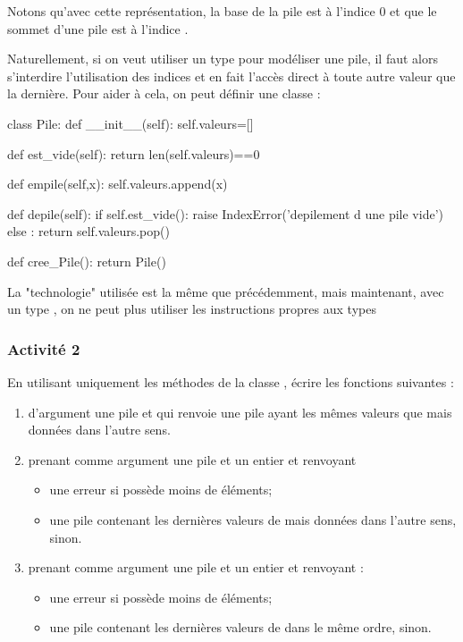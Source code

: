 \documentclass[11pt,a4paper,french,twoside]{PMCours}
\begin{document}
Notons qu'avec cette représentation, la base de la pile est à l'indice 0 et que 
le sommet d'une pile  est à l'indice .


Naturellement, si on veut utiliser un type  pour modéliser une pile, 
il faut alors s'interdire l'utilisation des indices et en fait l'accès direct à 
toute autre valeur que la dernière.
\newpage\noindent
Pour aider à cela, on peut définir une classe  :

\begin{Python}
class Pile:
    def __init__(self):
        self.valeurs=[]
    
    def est_vide(self):
        return len(self.valeurs)==0
    
    def empile(self,x):
        self.valeurs.append(x)
    
    def depile(self):
        if self.est_vide():
            raise IndexError('depilement d une pile vide')
        else :
            return self.valeurs.pop()

def cree_Pile():
    return Pile()
\end{Python}%

La "technologie" utilisée est la même que précédemment, mais maintenant, avec un
type , on ne peut plus utiliser les instructions propres aux types  

\subsubsection*{Activité 2}
En utilisant uniquement les méthodes de la classe , écrire les fonctions 
suivantes : 
\begin{enumerate}
\item {} d'argument une pile  et qui renvoie une pile 
ayant les mêmes valeurs que  mais données dans l'autre sens.
\item {} prenant comme argument une pile  et 
un entier  et renvoyant 
\begin{itemize}
\item une erreur si  possède moins de  éléments;
\item une pile contenant les  dernières valeurs de  
mais données dans l'autre sens, sinon.
\end{itemize}
\item {} prenant comme argument une pile  et un entier 
 et renvoyant :
\begin{itemize}
    \item une erreur si  possède moins de  éléments;
    \item une pile contenant les  dernières valeurs de  
    dans le même ordre, sinon.
\end{itemize}
\end{enumerate}
\newpage\noindent
\end{document}
